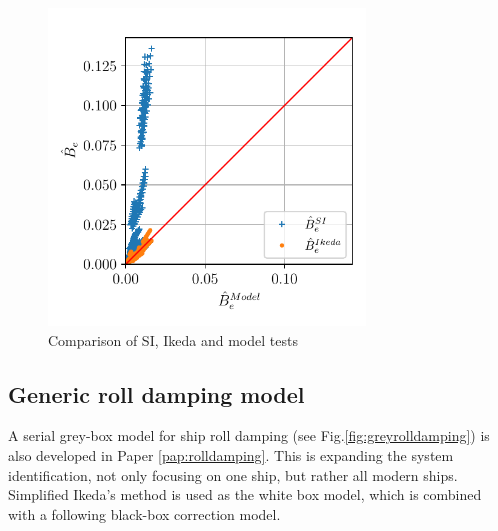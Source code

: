\begin{figure}[H]

    \includegraphics[width=0.75\textwidth]{kappa/images/si_ikeda_model.pdf}
    \caption{Comparison of SI, Ikeda and model tests}
    \label{fig:si_ikeda_model}

\end{figure}





\subsection{Generic roll damping model}
\label{sec:genericrolldampingmodel}
A serial grey-box model for ship roll damping (see Fig.\ref{fig:greyrolldamping}) is also developed in Paper \ref{pap:rolldamping}. 
This is expanding the system identification, not only focusing on one ship, but rather all modern ships. 
Simplified Ikeda's method \cite{kawahara_simple_2011} is used as the white box model, which is combined with a following black-box correction model.

